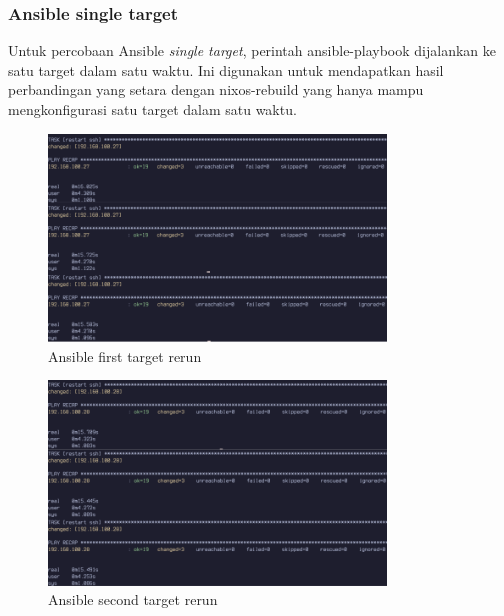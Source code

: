 \documentclass[10pt,twoside]{report}
\begin{document}
\begin{adjustwidth}{20pt}{}
	\subsubsection{Ansible single target}
	\begin{adjustwidth}{20pt}{}
		Untuk percobaan Ansible \textit{single target}, perintah ansible-playbook dijalankan
		ke satu target dalam satu waktu. Ini digunakan untuk mendapatkan hasil perbandingan
		yang setara dengan nixos-rebuild yang hanya mampu mengkonfigurasi satu target
		dalam satu waktu.
	\end{adjustwidth}
	\begin{figure}[H]
		\begin{center}
			\includegraphics[width=0.8\textwidth]{images/ansible/single/ansible-rerun-27-com.png}
		\end{center}
		\caption{Ansible first target rerun}
	\end{figure}
	\begin{figure}[H]
		\begin{center}
			\includegraphics[width=0.8\textwidth]{images/ansible/single/ansible-rerun-28-com.png}
		\end{center}
		\caption{Ansible second target rerun}
	\end{figure}


\end{adjustwidth}
\end{document}
